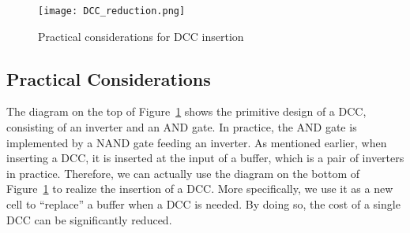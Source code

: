 \begin{figure}
    \centering
    \texttt{[image: DCC\_reduction.png]} %
    \caption{Practical considerations for DCC insertion}
    \label{fig:dccreduc}
\end{figure}

\subsection{Practical Considerations}
\label{subsec:tpc}
The diagram on the top of Figure~\ref{fig:dccreduc} shows the primitive design of a DCC, consisting of an inverter and an AND gate. In practice, the AND gate is implemented by a NAND gate feeding an inverter. As mentioned earlier, when inserting a DCC, it is inserted at the input of a buffer, which is a pair of inverters in practice. Therefore, we can actually use the diagram on the bottom of Figure~\ref{fig:dccreduc} to realize the insertion of a DCC. More specifically, we use it as a new cell to \enquote{replace} a buffer when a DCC is needed. By doing so, the cost of a single DCC can be significantly reduced.%
